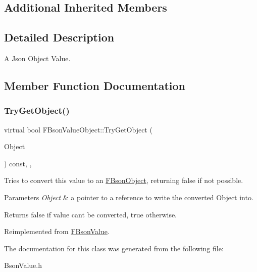 \subsection*{Additional Inherited Members}


\subsection{Detailed Description}
A Json Object Value. 

\subsection{Member Function Documentation}
\mbox{\label{class_f_bson_value_object_adf5ee6fb14cdfea399c4c25a4778a414}} 
\subsubsection{\texorpdfstring{Try\+Get\+Object()}{TryGetObject()}}
{\footnotesize\ttfamily virtual bool F\+Bson\+Value\+Object\+::\+Try\+Get\+Object (\begin{DoxyParamCaption}\item[{const T\+Shared\+Ptr$<$ \mbox{\hyperlink{class_f_bson_object}{F\+Bson\+Object}} $>$ $\ast$\&}]{Object }\end{DoxyParamCaption}) const\hspace{0.3cm}{\ttfamily [inline]}, {\ttfamily [override]}, {\ttfamily [virtual]}}

Tries to convert this value to an \mbox{\hyperlink{class_f_bson_object}{F\+Bson\+Object}}, returning false if not possible.


\begin{DoxyParams}{Parameters}
{\em Object} & a pointer to a reference to write the converted Object into. \\
\hline
\end{DoxyParams}
\begin{DoxyReturn}{Returns}
false if value can\textquotesingle{}t be converted, true otherwise. 
\end{DoxyReturn}


Reimplemented from \mbox{\hyperlink{class_f_bson_value_a8f80bf7d02f1ac317a95fcc99776577b}{F\+Bson\+Value}}.



The documentation for this class was generated from the following file\+:\begin{DoxyCompactItemize}
\item 
Bson\+Value.\+h\end{DoxyCompactItemize}
